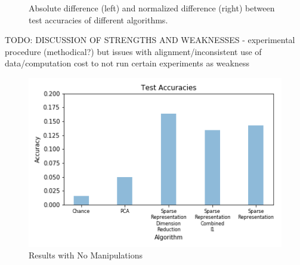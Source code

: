 \documentclass[pageno]{cos429}
\begin{document}
\begin{figure}[ht]
\centering
{}
\caption{Absolute difference (left) and normalized difference (right) between test accuracies of different algorithms.}
\label{fig:results_diff}
\end{figure}

TODO: DISCUSSION OF STRENGTHS AND WEAKNESSES - experimental procedure (methodical?) but issues with alignment/inconsistent use of data/computation cost to not run certain experiments as weakness

\begin{figure}
\centering
\includegraphics[scale=0.5]{../figures/results_plots/default.png}
\caption{Results with No Manipulations}
\label{fig:results_default}
\end{figure}
\end{document}
